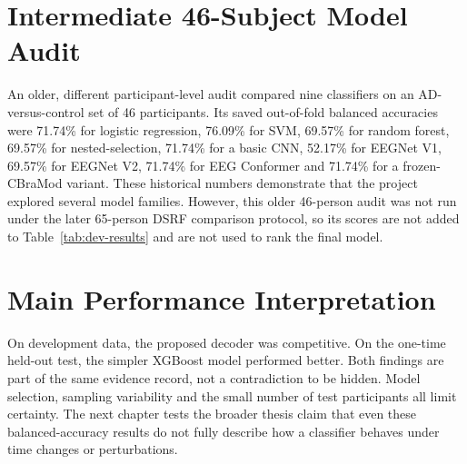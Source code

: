 \section{Intermediate 46-Subject Model Audit}
An older, different participant-level audit compared nine classifiers on an AD-versus-control set of 46 participants. Its saved out-of-fold balanced accuracies were 71.74\% for logistic regression, 76.09\% for SVM, 69.57\% for random forest, 69.57\% for nested-selection, 71.74\% for a basic CNN, 52.17\% for EEGNet V1, 69.57\% for EEGNet V2, 71.74\% for EEG Conformer and 71.74\% for a frozen-CBraMod variant. These historical numbers demonstrate that the project explored several model families. However, this older 46-person audit was not run under the later 65-person DSRF comparison protocol, so its scores are not added to Table~\ref{tab:dev-results} and are not used to rank the final model.

\section{Main Performance Interpretation}
On development data, the proposed decoder was competitive. On the one-time held-out test, the simpler XGBoost model performed better. Both findings are part of the same evidence record, not a contradiction to be hidden. Model selection, sampling variability and the small number of test participants all limit certainty. The next chapter tests the broader thesis claim that even these balanced-accuracy results do not fully describe how a classifier behaves under time changes or perturbations.
